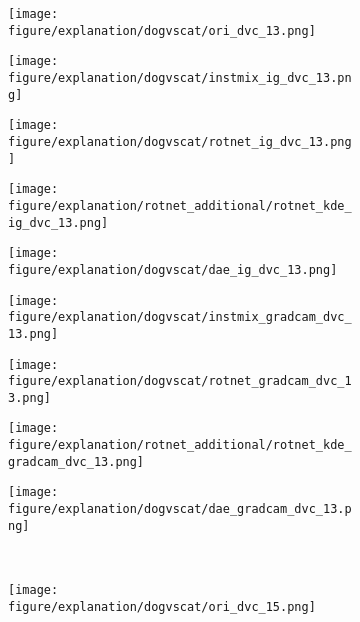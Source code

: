 \documentclass{article} \usepackage{iclr2021_conference,times}
\begin{document}
\begin{figure}[h!]
\begin{subfigure}{.11\textwidth}
  \centering
  \texttt{[image: figure/explanation/dogvscat/ori\_dvc\_13.png]}
\end{subfigure}
\hspace{-2mm}
\begin{subfigure}{.11\textwidth}
  \centering
  \texttt{[image: figure/explanation/dogvscat/instmix\_ig\_dvc\_13.png]}
\end{subfigure}
\hspace{-2mm}
\begin{subfigure}{.11\textwidth}
  \centering
  \texttt{[image: figure/explanation/dogvscat/rotnet\_ig\_dvc\_13.png]}
\end{subfigure}
\hspace{-2mm}
\begin{subfigure}{.11\textwidth}
  \centering
  \texttt{[image: figure/explanation/rotnet\_additional/rotnet\_kde\_ig\_dvc\_13.png]}
\end{subfigure}
\hspace{-2mm}
\begin{subfigure}{.11\textwidth}
  \centering
  \texttt{[image: figure/explanation/dogvscat/dae\_ig\_dvc\_13.png]}
\end{subfigure}
\hspace{-2mm}
\begin{subfigure}{.11\textwidth}
  \centering
  \texttt{[image: figure/explanation/dogvscat/instmix\_gradcam\_dvc\_13.png]}
\end{subfigure}
\hspace{-2mm}
\begin{subfigure}{.11\textwidth}
  \centering
  \texttt{[image: figure/explanation/dogvscat/rotnet\_gradcam\_dvc\_13.png]}
\end{subfigure}
\hspace{-2mm}
\begin{subfigure}{.11\textwidth}
  \centering
  \texttt{[image: figure/explanation/rotnet\_additional/rotnet\_kde\_gradcam\_dvc\_13.png]}
\end{subfigure}
\hspace{-2mm}
\begin{subfigure}{.11\textwidth}
  \centering
  \texttt{[image: figure/explanation/dogvscat/dae\_gradcam\_dvc\_13.png]}
\end{subfigure}\\
\begin{subfigure}{.11\textwidth}
  \centering
  \texttt{[image: figure/explanation/dogvscat/ori\_dvc\_15.png]}

\end{subfigure}
\end{figure}
\end{document}

